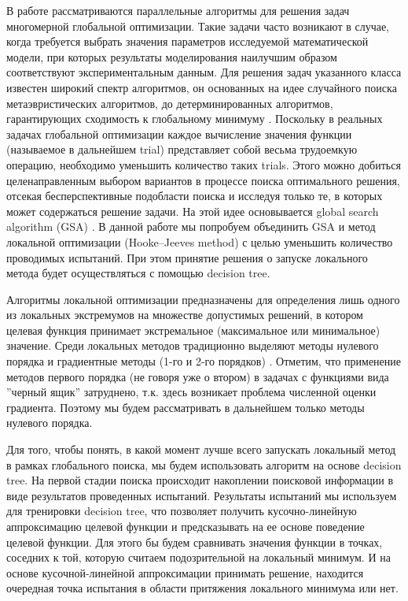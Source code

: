 \documentclass{svproc}
\begin{document}
В работе рассматриваются параллельные алгоритмы для решения задач многомерной глобальной оптимизации. Такие задачи часто возникают в случае, когда требуется выбрать значения параметров исследуемой математической модели, при которых результаты моделирования наилучшим образом соответствуют экспериментальным данным.
Для решения задач указанного класса известен широкий спектр алгоритмов, он основанных на идее случайного поиска \cite{fio_bib1, fio_bib2, fio_bib3} метаэвристических алгоритмов, до детерминированных алгоритмов, гарантирующих сходимость к глобальному минимуму \cite{fio_bib4, fio_bib5, fio_bib6}. 
Поскольку в реальных задачах глобальной оптимизации каждое вычисление значения функции (называемое в дальнейшем trial) представляет собой весьма трудоемкую операцию, необходимо уменьшить количество таких trials. Этого можно добиться целенаправленным выбором вариантов в процессе поиска оптимального решения, отсекая бесперспективные подобласти поиска и исследуя только те, в которых может содержаться решение задачи. На этой идее основывается global search algorithm (GSA) \cite{fio_bib7}. В данной работе мы попробуем объединить GSA и метод локальной оптимизации (Hooke--Jeeves method) с целью уменьшить количество проводимых испытаний. При этом принятие решения о запуске локального метода будет осуществляться с помощью decision tree.

Алгоритмы локальной оптимизации предназначены для определения лишь одного из локальных экстремумов на множестве допустимых решений, в котором целевая функция принимает экстремальное (максимальное или минимальное) значение. 
Среди локальных методов традиционно выделяют методы нулевого порядка и градиентные методы  (1-го и 2-го порядков) \cite{fio_bib8,fio_bib9}.
Отметим, что применение методов первого порядка (не говоря уже о втором) в задачах с функциями вида ''черный ящик'' затруднено, т.к. здесь возникает проблема численной оценки градиента. Поэтому мы будем рассматривать в дальнейшем только методы нулевого порядка.

Для того, чтобы понять, в какой момент лучше всего запускать локальный метод в рамках глобального поиска, мы будем использовать алгоритм на основе decision tree.
На первой стадии поиска происходит накоплении поисковой информации в виде результатов проведенных испытаний.
Результаты испытаний мы используем для тренировки decision tree, что позволяет получить кусочно-линейную аппроксимацию целевой функции и  предсказывать на ее основе поведение целевой функции. Для этого бы будем сравнивать значения функции в точках, соседних к той, которую считаем подозрительной на локальный минимум. И на основе кусочной-линейной аппроксимации принимать решение, находится очередная точка испытания в области притяжения локального минимума или нет.
\end{document}
